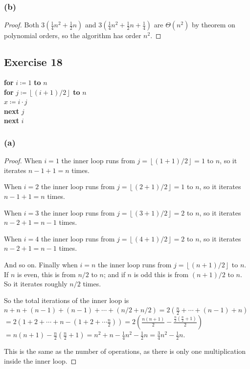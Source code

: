 \documentclass[14pt]{extarticle}
\newcommand{\dps}{\displaystyle}
\newcommand{\floor}[1]{{\left\lfloor#1\right\rfloor}}
\begin{document}
\subsubsection{(b)}
\begin{proof}
Both \(\dps 3 \left(\frac{1}{4}n^2+\frac{1}{2}n\right)\) and \(\dps 3 \left(\frac{1}{4}n^2+\frac{1}{2}n+\frac{1}{4}\right)\) 
are \(\Theta(n^2)\) by theorem on polynomial orders, so the algorithm has order \(n^2\).
\end{proof}

\subsection{Exercise 18}
\begin{tabbing}
{\bf for} \= \(i \coloneqq 1\) {\bf to} \(n\) \\
          \> {\bf for} \= \(j \coloneqq \floor{(i+1)/2}\) {\bf to} \(n\) \\
          \>           \> \(x \coloneqq i \cdot j\) \\
          \> {\bf next} \(j\) \\
{\bf next} \(i\)
\end{tabbing}

\subsubsection{(a)}
\begin{proof}
When \(i=1\) the inner loop runs from \(j = \floor{(1+1)/2} = 1\) to \(n\), so it iterates \(n-1+1 = n\) times.

When \(i=2\) the inner loop runs from \(j = \floor{(2+1)/2} = 1\) to \(n\), so it iterates \(n-1+1 = n\) times.

When \(i=3\) the inner loop runs from \(j = \floor{(3+1)/2} = 2\) to \(n\), so it iterates \(n-2+1 = n-1\) times.

When \(i=4\) the inner loop runs from \(j = \floor{(4+1)/2} = 2\) to \(n\), so it iterates \(n-2+1 = n-1\) times.

And so on. Finally when \(i = n\) the inner loop runs from \(j = \floor{(n+1)/2}\) to \(n\). If \(n\) is even, this is from
\(n/2\) to \(n\); and if \(n\) is odd this is from \((n+1)/2\) to \(n\). So it iterates roughly \(n/2\) times.

So the total iterations of the inner loop is \(n+n+(n-1)+(n-1)+ \cdots + (n/2 + n/2) = 2(\frac{n}{2} + \cdots + (n-1) + n)\)
\(= 2(1+2+ \cdots + n - (1+2+ \cdots \frac{n}{2})) = 2 \left( \frac{n(n+1)}{2}-\frac{\frac{n}{2}(\frac{n}{2}+1)}{2}\right)\)
\(= n(n+1) - \frac{n}{2}(\frac{n}{2}+1) = n^2 + n - \frac{1}{4}n^2 - \frac{1}{2}n = \frac{3}{4}n^2 - \frac{1}{2}n\).

This is the same as the number of operations, as there is only one multiplication inside the inner loop. 
\end{proof}
\end{document}
